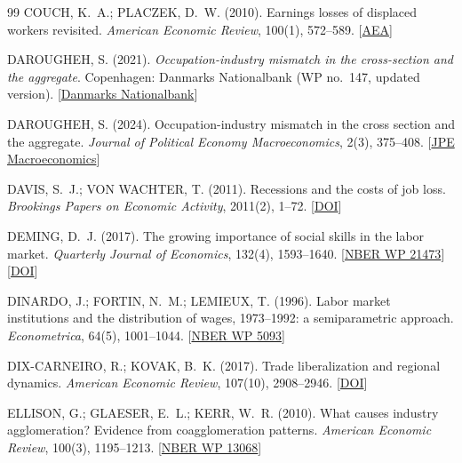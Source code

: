 \documentclass[11pt,a4paper]{article}
\begin{document}
{\begin{thebibliography}{99}
COUCH, K.~A.; PLACZEK, D.~W. (2010). Earnings losses of displaced workers revisited. \textit{American Economic Review}, 100(1), 572--589. [\href{https://pubs.aeaweb.org/doi/abs/10.1257/aer.100.1.572}{AEA}]

DAROUGHEH, S. (2021). \textit{Occupation-industry mismatch in the cross-section and the aggregate}. Copenhagen: Danmarks Nationalbank (WP no.~147, updated version). [\href{https://www.nationalbanken.dk/en/news-and-knowledge/publications-and-speeches/archive-publications/2019/working-paper-occupation-industry-mismatch-in-the-cross-section-and-the-aggregate}{Danmarks Nationalbank}]

DAROUGHEH, S. (2024). Occupation-industry mismatch in the cross section and the aggregate. \textit{Journal of Political Economy Macroeconomics}, 2(3), 375--408. [\href{https://www.journals.uchicago.edu/doi/10.1086/731536}{JPE Macroeconomics}]

DAVIS, S.~J.; VON WACHTER, T. (2011). Recessions and the costs of job loss. \textit{Brookings Papers on Economic Activity}, 2011(2), 1--72. [\href{https://doi.org/10.1353/eca.2011.0016}{DOI}]

DEMING, D.~J. (2017). The growing importance of social skills in the labor market. \textit{Quarterly Journal of Economics}, 132(4), 1593--1640. [\href{https://www.nber.org/papers/w21473}{NBER WP 21473}] [\href{https://doi.org/10.1093/qje/qjx022}{DOI}]

DINARDO, J.; FORTIN, N.~M.; LEMIEUX, T. (1996). Labor market institutions and the distribution of wages, 1973--1992: a semiparametric approach. \textit{Econometrica}, 64(5), 1001--1044. [\href{https://www.nber.org/papers/w5093}{NBER WP 5093}]

DIX-CARNEIRO, R.; KOVAK, B.~K. (2017). Trade liberalization and regional dynamics. \textit{American Economic Review}, 107(10), 2908--2946. [\href{https://doi.org/10.1257/aer.20161214}{DOI}]

ELLISON, G.; GLAESER, E.~L.; KERR, W.~R. (2010). What causes industry agglomeration? Evidence from coagglomeration patterns. \textit{American Economic Review}, 100(3), 1195--1213. [\href{https://www.nber.org/papers/w13068}{NBER WP 13068}]


\end{thebibliography}}
\end{document}
